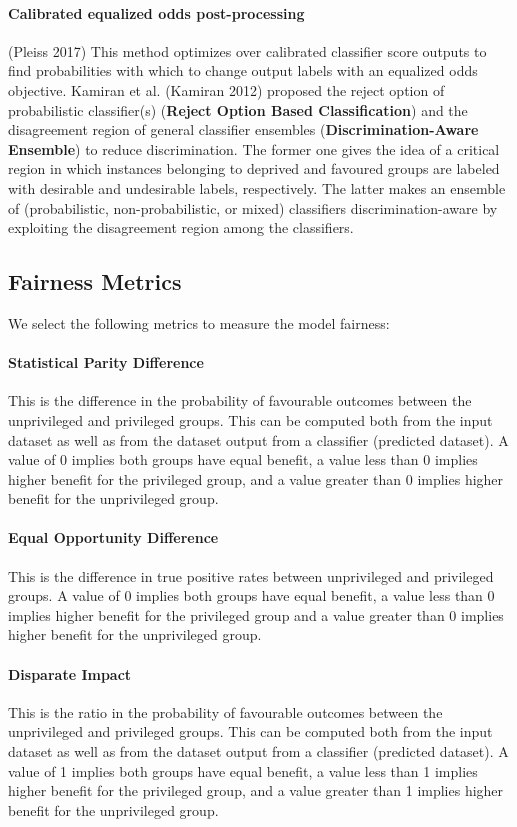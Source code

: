 \documentclass{article}
\begin{document}
\paragraph{Calibrated equalized odds post-processing} (Pleiss 2017) This method optimizes over calibrated classifier score outputs to find probabilities with which to change output labels with an equalized odds objective. 
Kamiran et al. (Kamiran 2012) proposed the reject option of probabilistic classifier(s) (\textbf{Reject Option Based Classification}) and the disagreement region of general classifier ensembles (\textbf{Discrimination-Aware Ensemble}) to reduce discrimination. The former one gives the idea of a critical region in which instances belonging to deprived and favoured groups are labeled with desirable and undesirable labels, respectively. The latter makes an ensemble of (probabilistic, non-probabilistic, or mixed) classifiers discrimination-aware by exploiting the disagreement region among the classifiers.

\subsection{Fairness Metrics}

We select the following metrics to measure the model fairness: 
\paragraph{Statistical Parity Difference} This is the difference in the probability of favourable outcomes between the unprivileged and privileged groups. This can be computed both from the input dataset as well as from the dataset output from a classifier (predicted dataset). A value of 0 implies both groups have equal benefit, a value less than 0 implies higher benefit for the privileged group, and a value greater than 0 implies higher benefit for the unprivileged group. 
\paragraph{Equal Opportunity Difference} This is the difference in true positive rates between unprivileged and privileged groups. A value of 0 implies both groups have equal benefit, a value less than 0 implies higher benefit for the privileged group and a value greater than 0 implies higher benefit for the unprivileged group. 
\paragraph{Disparate Impact }This is the ratio in the probability of favourable outcomes between the unprivileged and privileged groups. This can be computed both from the input dataset as well as from the dataset output from a classifier (predicted dataset). A value of 1 implies both groups have equal benefit, a value less than 1 implies higher benefit for the privileged group, and a value greater than 1 implies higher benefit for the unprivileged group.
\end{document}
